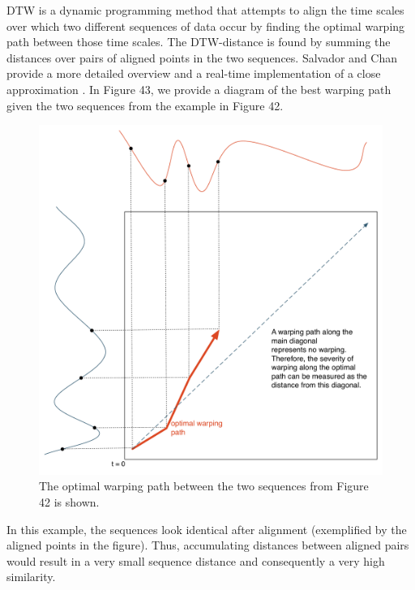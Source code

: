 \documentclass[12pt]{report} 	%
\numberwithin{figure}{chapter}
\numberwithin{table}{chapter}
\numberwithin{equation}{chapter}
\begin{document}
\begin{flushleft}
DTW is a dynamic programming method that attempts to align the time scales over which two different sequences of data occur by finding the optimal warping path between those time scales. The DTW-distance is found by summing the distances over pairs of aligned points in the two sequences. Salvador and Chan provide a more detailed overview and a real-time implementation of a close approximation \cite{Salvador:2004et}. In Figure 43, we provide a diagram of the best warping path given the two sequences from the example in Figure 42.
\begin{figure}[h!]
\begin{center}
\includegraphics[scale=0.5]{DTWExample}
\caption[Optimal warping path]{The optimal warping path between the two sequences from Figure 42 is shown.}
\end{center}
\end{figure}

In this example, the sequences look identical after alignment (exemplified by the aligned points in the figure). Thus, accumulating distances between aligned pairs would result in a very small sequence distance and consequently a very high similarity.


\end{flushleft}
\end{document}
